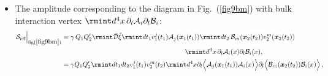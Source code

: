 \begin{itemize}
\vspace{-0.5cm}
\item The amplitude corresponding to the diagram in Fig.~(\ref{fig9bm}) with bulk interaction vertex $\rmint d^4x\,\partial_l\mathcal{A}_i\partial_l\mathcal{B}_i$:
\begin{align}
    \begin{split}
   \mathcal{S}_{\text{eff}}\Big|_{\text{fig}(\ref{fig9bm})}&=\gamma \,Q_1 Q_2'\rmint\Bar{\mathcal{D}}\Hat{\xi}\rmint dt_1v_1^j(t_1)\mathcal{A}_j(\boldsymbol{x}_1(t_1))\rmint dt_2\, \mathcal{B}_m(\boldsymbol{x}_2(t_2))v_2^m(\boldsymbol{x}_2(t_2))\\ & \hspace{6.5 cm}\rmint d^4x\,\partial_l\mathcal{A}_i(x)\partial_l\mathcal{B}_i(x),\\&=\gamma Q_1 Q_2'\rmint dt_1dt_2v_1^j(t_1)v_2^m(t_2)\rmint d^4x\partial_l\Big{\langle}\mathcal{A}_j(\boldsymbol{x}_1(t_1))\mathcal{A}_i(x)\Big{\rangle}\partial_l\Big{\langle}\mathcal{B}_m(\boldsymbol{x}_2(t_2))\mathcal{B}_i(x)\Big{\rangle}\,,\\ &

\end{split}
\end{align}
\end{itemize}
